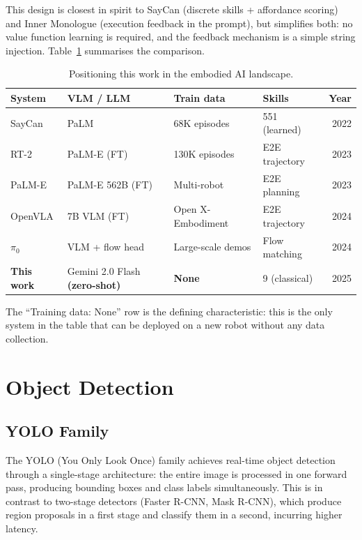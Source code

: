 This design is closest in spirit to SayCan (discrete skills + affordance scoring) and
Inner Monologue (execution feedback in the prompt), but simplifies both: no value
function learning is required, and the feedback mechanism is a simple string injection.
Table~\ref{tab:embodied_comparison} summarises the comparison.

\begin{table}[H]
\centering
\caption{Positioning this work in the embodied AI landscape.}
\label{tab:embodied_comparison}
\small
\begin{tabularx}{\linewidth}{lXXXr}
\toprule
\textbf{System} & \textbf{VLM / LLM} & \textbf{Train data} & \textbf{Skills} & \textbf{Year} \\
\midrule
SayCan \cite{ahn2022saycan}   & PaLM             & 68K episodes       & 551 (learned)  & 2022 \\
RT-2 \cite{brohan2023rt2}     & PaLM-E (FT)      & 130K episodes      & E2E trajectory & 2023 \\
PaLM-E \cite{driess2023palme} & PaLM-E 562B (FT) & Multi-robot        & E2E planning   & 2023 \\
OpenVLA \cite{kim2024openvla} & 7B VLM (FT)      & Open X-Embodiment  & E2E trajectory & 2024 \\
$\pi_0$ \cite{black2024pi0}   & VLM + flow head  & Large-scale demos  & Flow matching  & 2024 \\
\midrule
\textbf{This work}            & Gemini 2.0 Flash \textbf{(zero-shot)} & \textbf{None} & 9 (classical) & 2025 \\
\bottomrule
\end{tabularx}
\normalsize
\end{table}

The ``Training data: None'' row is the defining characteristic: this is the only
system in the table that can be deployed on a new robot without any data collection.

\section{Object Detection}
\label{sec:detection}

\subsection{YOLO Family}

The YOLO (You Only Look Once) family \cite{bochkovskiy2020yolov4} achieves real-time
object detection through a single-stage architecture: the entire image is processed
in one forward pass, producing bounding boxes and class labels simultaneously.
This is in contrast to two-stage detectors (Faster R-CNN, Mask R-CNN), which
produce region proposals in a first stage and classify them in a second, incurring
higher latency.

